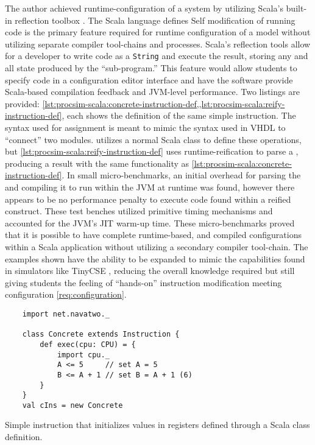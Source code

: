 The author achieved runtime-configuration of a system by utilizing Scala's built-in reflection toolbox \cite{Scala-Reflection}. The Scala language defines  Self modification of running code is the primary feature required for runtime configuration of a model without utilizing separate compiler tool-chains and processes. Scala's reflection tools allow for a developer to write code as a \texttt{String} and execute the result, storing any and all state produced by the ``sub-program.'' This feature would allow students to specify code in a configuration editor interface and have the software provide Scala-based compilation feedback and JVM-level performance. Two listings are provided: \cref{lst:procsim-scala:concrete-instruction-def,,lst:procsim-scala:reify-instruction-def}, each shows the definition of the same simple instruction. The syntax used for assignment is meant to mimic the syntax used in VHDL to ``connect'' two modules.  utilizes a normal Scala class to define these operations, but \cref{lst:procsim-scala:reify-instruction-def} uses runtime-reification to parse a , producing a result with the same functionality as \cref{lst:procsim-scala:concrete-instruction-def}. In small micro-benchmarks, an initial overhead for parsing the  and compiling it to run within the JVM at runtime was found, however there appears to be no performance penalty to execute code found within a reified construct. These test benches utilized primitive timing mechanisms and accounted for the JVM's JIT warm-up time. These micro-benchmarks proved that it is possible to have complete runtime-based, and compiled configurations within a Scala application without utilizing a secondary compiler tool-chain. The examples shown have the ability to be expanded to mimic the capabilities found in simulators like TinyCSE \cite{Nakamura2013, McLoughlin2010}, reducing the overall knowledge required but still giving students the feeling of ``hands-on'' instruction modification meeting configuration \cref{req:configuration}.

\begin{listing}[ht!]
    \begin{verbatim}
    import net.navatwo._
    
    class Concrete extends Instruction {
        def exec(cpu: CPU) = {
            import cpu._
            A <= 5     // set A = 5
            B <= A + 1 // set B = A + 1 (6)
        }
    }
    val cIns = new Concrete
    \end{verbatim}
    \caption{Simple instruction that initializes values in registers defined through a Scala class definition.}
    \label{lst:procsim-scala:concrete-instruction-def}
\end{listing}

